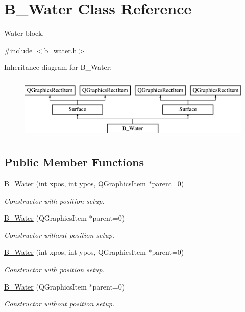 \hypertarget{class_b___water}{}\section{B\+\_\+\+Water Class Reference}
\label{class_b___water}


Water block.  




{\ttfamily \#include $<$b\+\_\+water.\+h$>$}

Inheritance diagram for B\+\_\+\+Water\+:\begin{figure}[H]
\begin{center}
\leavevmode
\includegraphics[height=3.000000cm]{class_b___water}
\end{center}
\end{figure}
\subsection*{Public Member Functions}
\begin{DoxyCompactItemize}
\item 
\hyperlink{class_b___water_a6c1ef8207043a950c74583332e00bb7f}{B\+\_\+\+Water} (int xpos, int ypos, Q\+Graphics\+Item $\ast$parent=0)
\begin{DoxyCompactList}\small\item\em Constructor with position setup. \end{DoxyCompactList}\item 
\hyperlink{class_b___water_a7286659987b70322806f866c1faaf218}{B\+\_\+\+Water} (Q\+Graphics\+Item $\ast$parent=0)
\begin{DoxyCompactList}\small\item\em Constructor without position setup. \end{DoxyCompactList}\item 
\hyperlink{class_b___water_a6c1ef8207043a950c74583332e00bb7f}{B\+\_\+\+Water} (int xpos, int ypos, Q\+Graphics\+Item $\ast$parent=0)
\begin{DoxyCompactList}\small\item\em Constructor with position setup. \end{DoxyCompactList}\item 
\hyperlink{class_b___water_a7286659987b70322806f866c1faaf218}{B\+\_\+\+Water} (Q\+Graphics\+Item $\ast$parent=0)
\begin{DoxyCompactList}\small\item\em Constructor without position setup. \end{DoxyCompactList}\end{DoxyCompactItemize}


